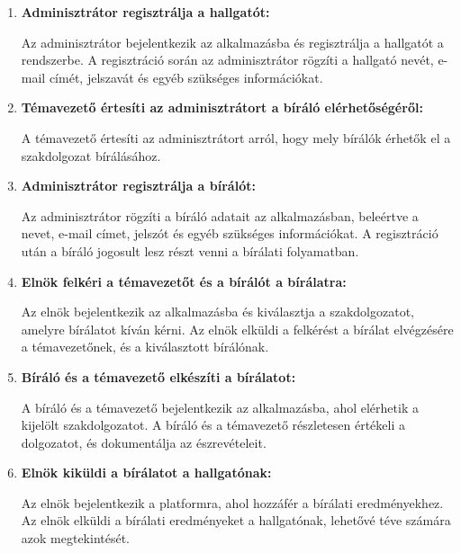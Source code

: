 \begin{enumerate}
\item \textbf{Adminisztrátor regisztrálja a hallgatót:}

Az adminisztrátor bejelentkezik az alkalmazásba és regisztrálja a hallgatót a rendszerbe.
A regisztráció során az adminisztrátor rögzíti a hallgató nevét, e-mail címét, jelszavát és egyéb szükséges információkat.

\item \textbf{Témavezető értesíti az adminisztrátort a bíráló elérhetőségéről:}

A témavezető értesíti az adminisztrátort arról, hogy mely bírálók érhetők el a szakdolgozat bírálásához. 

\item \textbf{Adminisztrátor regisztrálja a bírálót:}

Az adminisztrátor rögzíti a bíráló adatait az alkalmazásban, beleértve a nevet, e-mail címet, jelszót és egyéb szükséges információkat. A regisztráció után a bíráló jogosult lesz részt venni a bírálati folyamatban.

\item \textbf{Elnök felkéri a témavezetőt és a bírálót a bírálatra:}

Az elnök bejelentkezik az alkalmazásba és kiválasztja a szakdolgozatot, amelyre bírálatot kíván kérni. Az elnök elküldi a felkérést a bírálat elvégzésére a témavezetőnek, és a kiválasztott bírálónak.

\item \textbf{Bíráló és a témavezető elkészíti a bírálatot:}

A bíráló és a témavezető bejelentkezik az alkalmazásba, ahol elérhetik a kijelölt szakdolgozatot. A bíráló és a témavezető részletesen értékeli a dolgozatot, és dokumentálja az észrevételeit.

\item \textbf{Elnök kiküldi a bírálatot a hallgatónak:}

Az elnök bejelentkezik a platformra, ahol hozzáfér a bírálati eredményekhez.
Az elnök elküldi a bírálati eredményeket a hallgatónak, lehetővé téve számára azok megtekintését.
\end{enumerate}

\newpage

